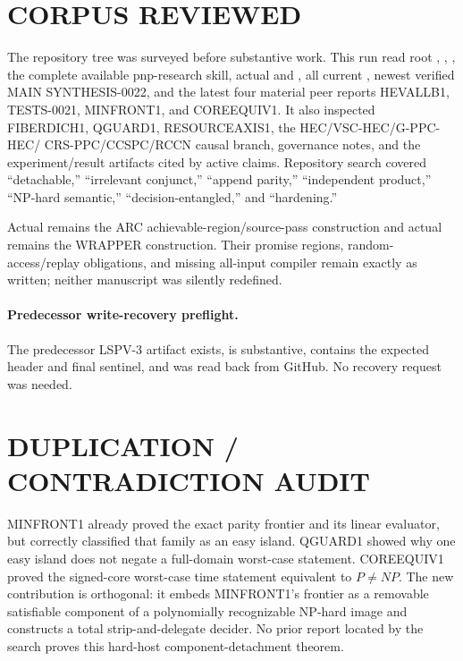 \documentclass[11pt]{article}
\begin{document}
\section{CORPUS REVIEWED}

The repository tree was surveyed before substantive work.  This run read root
, , , the complete available
pnp-research skill, actual  and , all current
, newest verified MAIN SYNTHESIS-0022, and the latest four
material peer reports HEVALLB1, TESTS-0021, MINFRONT1, and COREEQUIV1.  It
also inspected FIBERDICH1, QGUARD1, RESOURCEAXIS1, the HEC/VSC-HEC/G-PPC-HEC/
CRS-PPC/CCSPC/RCCN causal branch, governance notes, and the experiment/result
artifacts cited by active claims.  Repository search covered ``detachable,''
``irrelevant conjunct,'' ``append parity,'' ``independent product,''
``NP-hard semantic,'' ``decision-entangled,'' and ``hardening.''

Actual  remains the ARC achievable-region/source-pass
construction and actual  remains the WRAPPER construction.
Their promise regions, random-access/replay obligations, and missing all-input
compiler remain exactly as written; neither manuscript was silently
redefined.

\paragraph{Predecessor write-recovery preflight.}
The predecessor LSPV-3 artifact
 exists,
is substantive, contains the expected header and final sentinel, and was read
back from GitHub.  No recovery request was needed.

\section{DUPLICATION / CONTRADICTION AUDIT}

MINFRONT1 already proved the exact parity frontier and its linear evaluator,
but correctly classified that family as an easy island.  QGUARD1 showed why
one easy island does not negate a full-domain worst-case statement.
COREEQUIV1 proved the signed-core worst-case time statement equivalent to
\(P\ne NP\).  The new contribution is orthogonal: it embeds MINFRONT1's
frontier as a removable satisfiable component of a polynomially recognizable
NP-hard image and constructs a total strip-and-delegate decider.  No prior
report located by the search proves this hard-host component-detachment
theorem.
\end{document}
